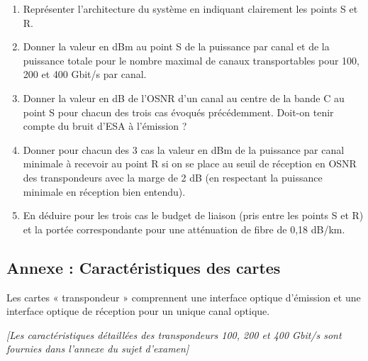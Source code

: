 \documentclass[a4paper,11pt]{article}
\begin{document}
\begin{enumerate}
    \item Représenter l'architecture du système en indiquant clairement les points S et R.
    
    \item Donner la valeur en dBm au point S de la puissance par canal et de la puissance totale pour le nombre maximal de canaux transportables pour 100, 200 et 400 Gbit/s par canal.
    
    \item Donner la valeur en dB de l'OSNR d'un canal au centre de la bande C au point S pour chacun des trois cas évoqués précédemment. Doit-on tenir compte du bruit d'ESA à l'émission ?
    
    \item Donner pour chacun des 3 cas la valeur en dBm de la puissance par canal minimale à recevoir au point R si on se place au seuil de réception en OSNR des transpondeurs avec la marge de 2 dB (en respectant la puissance minimale en réception bien entendu).
    
    \item En déduire pour les trois cas le budget de liaison (pris entre les points S et R) et la portée correspondante pour une atténuation de fibre de 0,18 dB/km.
\end{enumerate}

\subsection*{Annexe : Caractéristiques des cartes}

Les cartes « transpondeur » comprennent une interface optique d'émission et une interface optique de réception pour un unique canal optique.

\textit{[Les caractéristiques détaillées des transpondeurs 100, 200 et 400 Gbit/s sont fournies dans l'annexe du sujet d'examen]}
\end{document}
